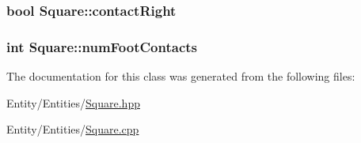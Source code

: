 \subsubsection[{contact\+Right}]{\setlength{\rightskip}{0pt plus 5cm}bool Square\+::contact\+Right\hspace{0.3cm}{\ttfamily [protected]}}\label{class_square_ab96608d72e01b3ebffd37bed24b6d070}
\hypertarget{class_square_a3c52d1135e840b92f50d5a74f19c7b51}{}
\subsubsection[{num\+Foot\+Contacts}]{\setlength{\rightskip}{0pt plus 5cm}int Square\+::num\+Foot\+Contacts\hspace{0.3cm}{\ttfamily [protected]}}\label{class_square_a3c52d1135e840b92f50d5a74f19c7b51}


The documentation for this class was generated from the following files\+:\begin{DoxyCompactItemize}
\item 
Entity/\+Entities/\hyperlink{_square_8hpp}{Square.\+hpp}\item 
Entity/\+Entities/\hyperlink{_square_8cpp}{Square.\+cpp}\end{DoxyCompactItemize}
